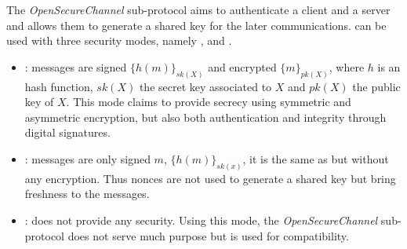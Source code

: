 \newcommand{\gereq}{GEReq}
\newcommand{\geres}{GERes}
\newcommand{\oscreq}{OSCReq}
\newcommand{\oscres}{OSCRes}


The {\em OpenSecureChannel} sub-protocol  aims to authenticate a client and
a server and allows them to generate a shared key for the later communications.
\opcua{} can be used with three security modes, namely {\em \smn}, {\em \sms} and
{\em \smse}.
\vspace{-.5em}
\begin{itemize}
    \item {\em \smse}: messages are signed $\{h(m)\}_{sk(X)}$ and
      encrypted $\{m\}_{pk(X)}$, where $h$ is an hash function, $sk(X)$ the secret key associated to $X$ and $pk(X)$ the public key of $X$.
      This mode claims to provide secrecy
      using symmetric and asymmetric encryption, but also both
      authentication and integrity through digital signatures.
  \item {\em \sms}: messages are only signed $m$, $\{h(m)\}_{sk(x)}$,
    it is the same as {\em \smse} but without any encryption.  Thus
    nonces are not used to generate a shared key but bring freshness
    to the messages.
  \item {\em \smn}: does not provide any security.  Using this mode, the
      {\em OpenSecureChannel} sub-protocol does not serve much
      purpose but is used for compatibility.
\end{itemize}

